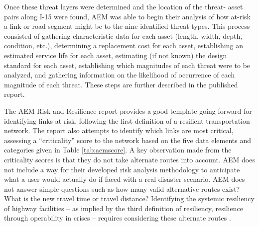 Once these threat layers were determined and the location of the threat-
asset pairs along I-15
were found, AEM was able to begin their analysis of how at-risk a link or road
segment might be to the nine identified threat types. This process consisted of
gathering characteristic
data for each asset (length, width, depth, condition, etc.), determining a
replacement cost for
each asset, establishing an estimated service life for each asset,
estimating (if not known) the
design standard for each asset, establishing which magnitudes of each
threat were to be analyzed,
and gathering information on the likelihood of occurrence of each
magnitude of each threat. These
steps are further described in the published report.

The AEM Risk and Resilience report provides a good template going forward for identifying
links at risk,
following the first definition of a resilient transportation network. The
report also attempts to
identify which links are most critical, assessing a “criticality”
score to the network
based on the five data elements and categories given in Table \ref{tab:aemscore}.
A key observation made from the
criticality scores is that they do not take alternate routes into account.
AEM does not include a way for their developed risk analysis methodology
to anticipate what a user would actually do if faced with a real disaster
scenario. AEM does not answer simple questions such as how many valid
alternative routes exist? What is the new travel time or travel distance?
Identifying the systemic resiliency of highway facilities
– as implied by the third definition of resiliency, resilience through
operability in crises – requires considering these alternate routes \citep{aem2017}.

\begin{table}

\caption{AEM Criticality Score}
\label{tab:aemscore}
\end{table}

